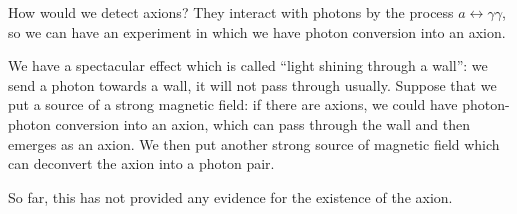 \documentclass[main.tex]{subfiles}
\begin{document}

How would we detect axions? They interact with photons by the process \(a \leftrightarrow \gamma \gamma \), so we can have an experiment in which we have photon conversion into an axion.

We have a spectacular effect which is called ``light shining through a wall'': we send a photon towards a wall, it will not pass through usually. 
Suppose that we put a source of a strong magnetic field: if there are axions, we could have photon-photon conversion into an axion, which can pass through the wall and then emerges as an axion.
We then put another strong source of magnetic field which can deconvert the axion into a photon pair.

So far, this has not provided any evidence for the existence of the axion.
\end{document}
